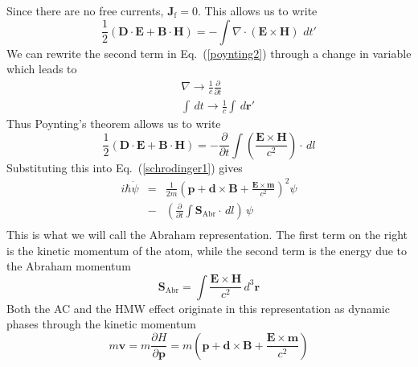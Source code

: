 Since there are no free currents, $\mathbf{J}_{\mathrm{f}}=0$.  This allows us to write
\begin{equation}
\frac{1}{2}\left(\mathbf{D}\cdot\mathbf{E}+\mathbf{B}\cdot\mathbf{H}\right)=-\int\nabla\cdot\left(\mathbf{E}\times\mathbf{H}\right)\,\,dt'
\label{poynting2}
\end{equation}
We can rewrite the second term in  Eq.\ (\ref{poynting2}) through a change in variable which leads to
\begin{eqnarray}
&&\nabla\rightarrow\frac{1}{c}\frac{\partial}{\partial t}\\
&&\int\,dt\rightarrow\frac{1}{c}\int\,d\mathbf{r}'
\end{eqnarray}
Thus Poynting's theorem allows us to write
\begin{equation}
\frac{1}{2}\left(\mathbf{D}\cdot\mathbf{E}+\mathbf{B}\cdot\mathbf{H}\right)=-\frac{\partial}{\partial t}\int\left(\frac{\mathbf{E}\times\mathbf{H}}{c^2}\right)\cdot\,dl
\label{poynting3}
\end{equation}
Substituting this into Eq.\ (\ref{schrodinger1}) gives
\begin{eqnarray}
i\hbar\dot{\psi}&=&\frac{1}{2m}\left(\mathbf{p}+ \mathbf{d}\times\mathbf{B}+\frac{\mathbf{E}\times\mathbf{m}}{c^2}\right)^2\psi\nonumber \\
&-&\left(\frac{\partial}{\partial t}\int \mathbf{S}_{\mathrm{Abr}}\cdot\,dl\right)\,\psi \nonumber\\
\label{schrodinger3}
\end{eqnarray}
This is what we will call the Abraham representation. The first term on the right is the kinetic momentum of the atom, while the second term is the energy due to the Abraham momentum 
\begin{equation}
\mathbf{S}_{\mathrm{Abr}}=\int\frac{\mathbf{E}\times\mathbf{H}}{c^2}\,d^3\mathbf{r}
\end{equation}
Both the AC and the HMW effect originate in this representation as dynamic phases through the kinetic momentum \cite{boyd}
\begin{equation}
m\mathbf{v}=m\frac{\partial H}{\partial \mathbf{p}}=m\left(\mathbf{p}+ \mathbf{d}\times\mathbf{B}+\frac{\mathbf{E}\times\mathbf{m}}{c^2}\right)
\end{equation}


